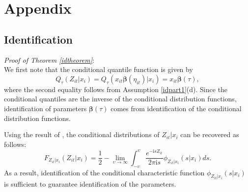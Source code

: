 \documentclass[12pt]{article}
\begin{document}
\section*{Appendix}
\begin{appendices}

\section{Identification} \label{identification}

\textit{Proof of Theorem \ref{idtheorem}}:\\
We first note that the conditional quantile function is given by
\begin{equation} \label{charQ}
Q_{\tau}(Z_{it}|x_{i})=Q_{\tau}(x_{it}\boldsymbol\beta(\eta_{it})|x_{i})=x_{it}\boldsymbol\beta(\tau),
\end{equation}
where the second equality follows from Assumption \eqref{idpart1}(d).
Since the conditional quantiles are the inverse of the conditional distribution functions, identification of parameters $\boldsymbol\beta(\tau)$ comes from identification of the conditional distribution functions.

Using the result of \cite{g}, the conditional distributions of $Z_{it}|x_{i}$ can be recovered as follows:
\begin{equation} \label{charCDF}
F_{Z_{it}|x_{i}}(Z_{it}|x_{i})=\frac{1}{2}-\underset{\upsilon\rightarrow \infty}{\operatorname{lim}}\int_{-\upsilon}^{\upsilon}\frac{e^{-\mathrm{i}sZ_{it}}}{2\pi \mathrm{i}s}\phi_{Z_{it}|x_{i}}(s|x_{i})ds.
\end{equation}
As a result, identification of the conditional characteristic function $\phi_{Z_{it}|x_{i}}(s|x_{i})$ is sufficient to guarantee identification of the parameters.


\end{appendices}
\end{document}
